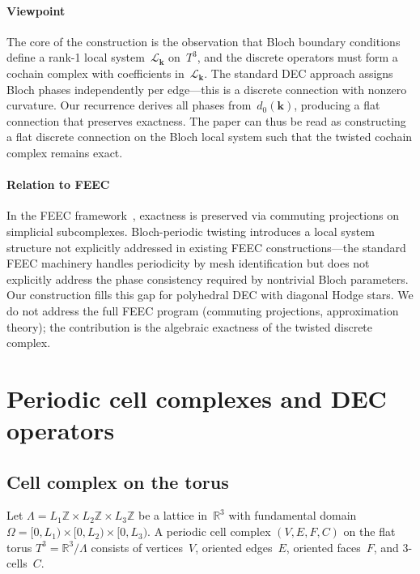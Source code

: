 \documentclass[12pt]{article}
\theoremstyle{definition}
\theoremstyle{remark}
\newcommand{\RR}{\mathbb{R}}
\newcommand{\ZZ}{\mathbb{Z}}
\newcommand{\kk}{\mathbf{k}}
\begin{document}
\paragraph{Viewpoint} The core of the construction is the observation that
Bloch boundary conditions define a rank-1 local system~$\mathcal{L}_\kk$
on~$T^3$, and the discrete operators must form a cochain complex with
coefficients in~$\mathcal{L}_\kk$. The standard DEC approach assigns Bloch
phases independently per edge---this is a discrete connection with nonzero
curvature. Our recurrence derives all phases from~$d_0(\kk)$, producing a flat
connection that preserves exactness. The paper can thus be read as constructing
a flat discrete connection on the Bloch local system such that the twisted
cochain complex remains exact.

\paragraph{Relation to FEEC} In the FEEC
framework~\cite{Arnold2006,Arnold2010}, exactness is preserved via commuting
projections on simplicial subcomplexes. Bloch-periodic twisting introduces a
local system structure not explicitly addressed in existing FEEC
constructions---the standard FEEC machinery handles periodicity by mesh
identification but does not explicitly address the phase consistency required
by nontrivial Bloch parameters. Our construction fills this gap for polyhedral
DEC with diagonal Hodge stars. We do not address the full FEEC program
(commuting projections, approximation theory); the contribution is the
algebraic exactness of the twisted discrete complex.

\section{Periodic cell complexes and DEC operators}
\label{sec:setup}

\subsection{Cell complex on the torus}

Let $\Lambda = L_1\ZZ \times L_2\ZZ \times L_3\ZZ$ be a lattice in~$\RR^3$
with fundamental domain $\Omega = [0,L_1) \times [0,L_2) \times [0,L_3)$.
A periodic cell complex $(V, E, F, C)$ on the flat torus
$T^3 = \RR^3/\Lambda$ consists of vertices~$V$, oriented edges~$E$, oriented
faces~$F$, and 3-cells~$C$.
\end{document}

